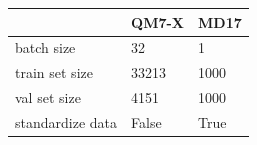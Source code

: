 \begin{tabular}{lll}
\toprule
                 & QM7-X & MD17 \\ \midrule
batch size       & 32    & 1    \\
train set size   & 33213 & 1000 \\
val set size     & 4151  & 1000 \\
standardize data & False & True \\ \bottomrule
\end{tabular}
